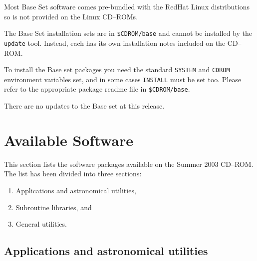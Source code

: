 \documentclass[twoside,11pt]{article}
\newcommand{\xlabel}[1]{}
\renewcommand{\_}{\texttt{\symbol{95}}}
\newcommand{\cdrom}{CD--ROM}
\newcommand{\cdrom}{CD-ROM}
\newcommand{\cdroms}{CD--ROMs}
\newcommand{\cdroms}{CD-ROMs}
\begin{document}
Most Base Set software comes pre-bundled with the RedHat Linux
distributions so is not provided on the Linux \cdroms.

The Base Set installation sets are in \texttt{\$CDROM/base} and cannot
be installed by the \texttt{update} tool.  Instead, each has its own
installation notes included on the \cdrom.

To install the Base set packages you need the standard \texttt{SYSTEM}
and \texttt{CDROM} environment variables set, and in some cases
\texttt{INSTALL} must be set too.  Please refer to the appropriate
package readme file in \texttt{\$CDROM/base}.

There are no updates to the Base set at this release.

\newpage
\appendix

\section{\xlabel{available_software}Available Software}
\label{available_software}

This section lists the software packages available on the Summer 2003 \cdrom.
The list has been divided into three sections:

\begin{enumerate}
\item Applications and astronomical utilities,
\item Subroutine libraries, and
\item General utilities.
\end{enumerate}

\subsection{\xlabel{applications_and_astronomical_utilities}Applications and astronomical utilities}
\label{applications_and_astronomical_utilities}
\end{document}
